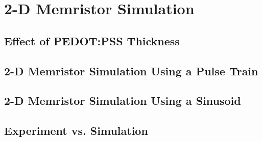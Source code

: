 
\chapter{2-D Memristor Simulation} %

\label{Chapter6} %


\section{Effect of PEDOT:PSS Thickness}
\section{2-D Memristor Simulation Using a Pulse Train}
\section{2-D Memristor Simulation Using a Sinusoid}
\section{Experiment vs. Simulation}